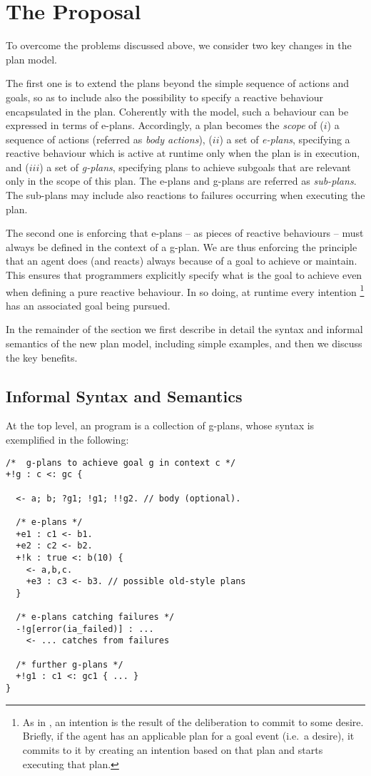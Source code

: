 \section{The {\aser} Proposal}
\label{sec:proposal}

To overcome the problems discussed above, we consider two key changes in the plan model. 

%
% 
%
The first one is to extend the plans beyond the simple sequence of actions and goals, so as to include also the possibility to specify a reactive behaviour encapsulated in the plan.
%
Coherently with the {\asl} model, such a behaviour can be expressed in terms of e-plans.
%
Accordingly, a plan becomes the \emph{scope} of ($i$) a sequence of actions (referred as \emph{body actions}), ($ii$) a set of \emph{e-plans}, specifying a reactive behaviour which is active at runtime only when the plan is in execution, and ($iii$) a set of \emph{g-plans}, specifying plans to achieve subgoals that are relevant only in the scope of this plan. The e-plans and g-plans are referred as \emph{sub-plans}.
%
The sub-plans may include also reactions to failures occurring when executing the plan.

%
%
%
The second one is enforcing that e-plans -- as pieces of reactive behaviours -- must always be defined in the context of a g-plan. We are thus  enforcing the principle that an agent does (and reacts) always because of a goal to achieve or maintain.
%
This ensures that programmers explicitly specify what is the goal to achieve even when defining a pure reactive behaviour. 
%
In so doing, at runtime every intention \footnote{As in \asl, an intention is the result of the deliberation to commit to some desire. Briefly, if the agent has an applicable plan for a goal event (i.e.\ a desire), it commits to it by creating an intention based on that plan and starts executing that plan.} has an associated goal being pursued.

In the remainder of the section we first describe in detail the syntax and informal semantics of the new plan model, including simple examples, and then we discuss the key benefits. 

\subsection{Informal Syntax and Semantics}

At the top level, an {\aser} program is a collection of g-plans, whose syntax is exemplified in the following:
%
%
{\small
\begin{verbatim}
/*  g-plans to achieve goal g in context c */
+!g : c <: gc { 

  <- a; b; ?g1; !g1; !!g2. // body (optional).

  /* e-plans */
  +e1 : c1 <- b1.	
  +e2 : c2 <- b2.
  +!k : true <: b(10) {
    <- a,b,c.
    +e3 : c3 <- b3. // possible old-style plans
  }	
  
  /* e-plans catching failures */
  -!g[error(ia_failed)] : ...
    <- ... catches from failures 

  /* further g-plans */
  +!g1 : c1 <: gc1 { ... }
}
\end{verbatim}}

